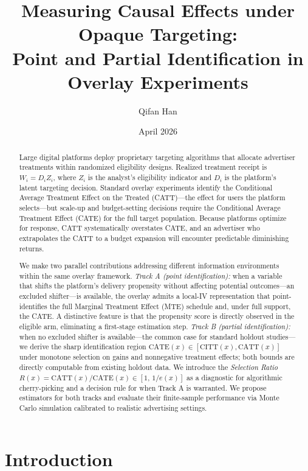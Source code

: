 \documentclass[11pt]{article}
\title{Measuring Causal Effects under Opaque Targeting:\\
Point and Partial Identification in Overlay Experiments}
\author{Qifan Han}
\date{April 2026}
\begin{document}
\maketitle

\begin{abstract}
Large digital platforms deploy proprietary targeting algorithms that allocate
advertiser treatments within randomized eligibility designs.  Realized treatment
receipt is $W_i = D_i Z_i$, where $Z_i$ is the analyst's eligibility indicator
and $D_i$ is the platform's latent targeting decision.  Standard overlay
experiments identify the Conditional Average Treatment Effect on the Treated
(CATT)---the effect for users the platform selects---but scale-up and
budget-setting decisions require the Conditional Average Treatment Effect (CATE)
for the full target population.  Because platforms optimize for response, CATT
systematically overstates CATE, and an advertiser who extrapolates the CATT to a
budget expansion will encounter predictable diminishing returns.

We make two parallel contributions addressing different information environments
within the same overlay framework.  \emph{Track A (point identification):} when
a variable that shifts the platform's delivery propensity without affecting
potential outcomes---an excluded shifter---is available, the overlay admits a
local-IV representation that point-identifies the full Marginal Treatment Effect
(MTE) schedule and, under full support, the CATE.  A distinctive feature is that
the propensity score is directly observed in the eligible arm, eliminating a
first-stage estimation step.  \emph{Track B (partial identification):} when no
excluded shifter is available---the common case for standard holdout studies---we
derive the sharp identification region $\mathrm{CATE}(x) \in [\mathrm{CITT}(x),
\mathrm{CATT}(x)]$ under monotone selection on gains and nonnegative treatment
effects; both bounds are directly computable from existing holdout data.  We
introduce the \emph{Selection Ratio} $R(x) = \mathrm{CATT}(x)/\mathrm{CATE}(x)
\in [1,\,1/e(x)]$ as a diagnostic for algorithmic cherry-picking and a decision
rule for when Track A is warranted.  We propose estimators for both tracks and
evaluate their finite-sample performance via Monte Carlo simulation calibrated to
realistic advertising settings.
\end{abstract}

\section{Introduction}
\label{sec:intro}
\end{document}
